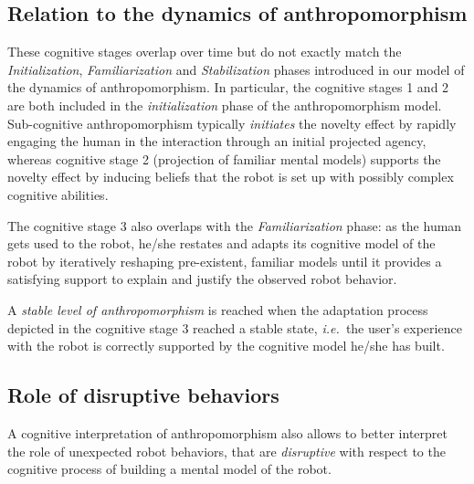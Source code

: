 \documentclass{frontiersSCNS} %
\newcommand{\ie}{{\textit{i.e.~}}}
\begin{document}
\subsection{Relation to the dynamics of anthropomorphism}

These cognitive stages overlap over time but do not exactly match the
\emph{Initialization}, \emph{Familiarization} and \emph{Stabilization} phases
introduced in our model of the dynamics of anthropomorphism. In particular,
the cognitive stages 1 and 2 are both included in the \emph{initialization} phase
of the anthropomorphism model. Sub-cognitive anthropomorphism typically
\emph{initiates} the novelty effect by rapidly engaging the human in the
interaction through an initial projected agency, whereas cognitive stage 2
(projection of familiar mental models) supports the novelty effect by inducing
beliefs that the robot is set up with possibly complex cognitive abilities.

The cognitive stage 3 also overlaps with the \emph{Familiarization} phase: as
the human gets used to the robot, he/she restates and adapts its
cognitive model of the robot by iteratively reshaping pre-existent, familiar
models until it provides a satisfying support to explain and justify the
observed robot behavior.

A \emph{stable level of anthropomorphism} is reached when the adaptation process
depicted in the cognitive stage 3 reached a stable state, \ie the user's
experience with the robot is correctly supported by the cognitive model he/she
has built.


\subsection{Role of disruptive behaviors}
\label{sec:disruptive}

A cognitive interpretation of anthropomorphism also allows to better interpret
the role of unexpected robot behaviors, that are \emph{disruptive} with respect
to the cognitive process of building a mental model of the robot.
\end{document}
